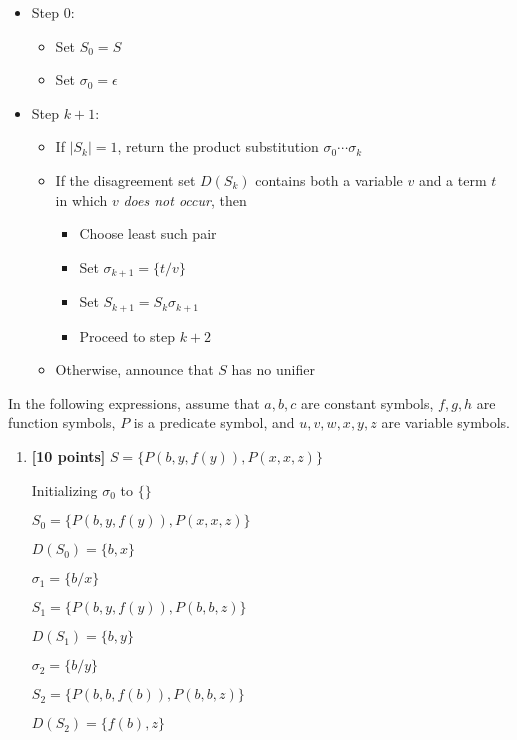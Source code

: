 \documentclass{article}
\begin{document}
\begin{enumerate}
\begin{itemize}
\item Step 0:
  \begin{itemize}
  \item Set $S_0 = S$
  \item Set $\sigma_0 = \epsilon$
  \end{itemize}

\item Step $k+1$:
  \begin{itemize}
  \item If $|S_k| = 1$, return the product substitution $\sigma_0\cdots\sigma_k$
  \item If the disagreement set $D(S_k)$ contains both a variable
    $v$ and a term $t$ in which $v$ \emph{does not occur}, then
    \begin{itemize}
    \item Choose least such pair
    \item Set $\sigma_{k+1} = \{ t/v \}$
    \item Set $S_{k+1} = S_k \sigma_{k+1}$
    \item Proceed to step $k+2$
    \end{itemize}
  \item Otherwise, announce that $S$ has no unifier
  \end{itemize}
\end{itemize}

  In the following expressions, assume that $a,b,c$ are constant
  symbols, $f,g,h$ are function symbols, $P$ is a predicate symbol,
  and $u,v,w,x,y,z$ are variable symbols.

  \begin{enumerate}

  \item \textbf{[10 points]}
    $S = \{ P(b,y,f(y)), P(x,x,z) \}$
    
        \begin{answer}
		Initializing $\sigma_0$ to $\{\}$
		
		$S_0 = \{P(b, y, f(y)), P(x, x, z)\}$
		
		$D(S_0) = \{b, x\}$
		\bigskip
		
		$\sigma_1 = \{b/x\}$
		
		$S_1 = \{P(b, y, f(y)), P(b, b, z)\}$
		
		$D(S_1) = \{b, y\}$
		\bigskip
		
		$\sigma_2 = \{b/y\}$

		$S_2 = \{P(b, b, f(b)), P(b, b, z)\}$

		$D(S_2) = \{f(b), z\}$	
		

\end{answer}
\end{enumerate}
\end{enumerate}
\end{document}
